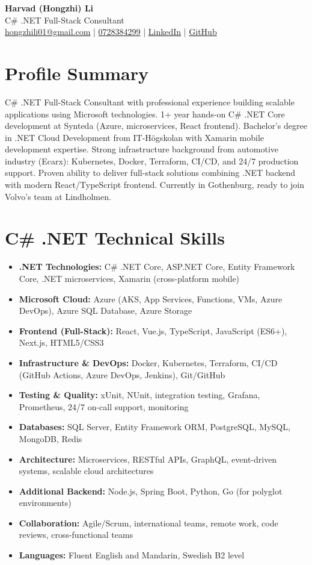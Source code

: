 \documentclass[11pt,a4paper]{article}
\begin{document}
\pagestyle{empty}

\begin{center}
{\LARGE \textbf{Harvad (Hongzhi) Li}}\\[10pt]
{\Large C\# .NET Full-Stack Consultant}\\[10pt]
\textcolor{linkedinblue}{\href{mailto:hongzhili01@gmail.com}{hongzhili01@gmail.com} | \href{tel:0728384299}{0728384299} | \href{https://www.linkedin.com/in/harvad/}{LinkedIn} | \href{https://github.com/bluehawana}{GitHub}}
\end{center}

\section*{Profile Summary}

C\# .NET Full-Stack Consultant with professional experience building scalable applications using Microsoft technologies. 1+ year hands-on C\# .NET Core development at Synteda (Azure, microservices, React frontend). Bachelor's degree in .NET Cloud Development from IT-Högskolan with Xamarin mobile development expertise. Strong infrastructure background from automotive industry (Ecarx): Kubernetes, Docker, Terraform, CI/CD, and 24/7 production support. Proven ability to deliver full-stack solutions combining .NET backend with modern React/TypeScript frontend. Currently in Gothenburg, ready to join Volvo's team at Lindholmen.

\section*{C\# .NET Technical Skills}
\begin{itemize}[leftmargin=*, itemsep=2pt]
\item \textbf{.NET Technologies:} C\# .NET Core, ASP.NET Core, Entity Framework Core, .NET microservices, Xamarin (cross-platform mobile)
\item \textbf{Microsoft Cloud:} Azure (AKS, App Services, Functions, VMs, Azure DevOps), Azure SQL Database, Azure Storage
\item \textbf{Frontend (Full-Stack):} React, Vue.js, TypeScript, JavaScript (ES6+), Next.js, HTML5/CSS3
\item \textbf{Infrastructure \& DevOps:} Docker, Kubernetes, Terraform, CI/CD (GitHub Actions, Azure DevOps, Jenkins), Git/GitHub
\item \textbf{Testing \& Quality:} xUnit, NUnit, integration testing, Grafana, Prometheus, 24/7 on-call support, monitoring
\item \textbf{Databases:} SQL Server, Entity Framework ORM, PostgreSQL, MySQL, MongoDB, Redis
\item \textbf{Architecture:} Microservices, RESTful APIs, GraphQL, event-driven systems, scalable cloud architectures
\item \textbf{Additional Backend:} Node.js, Spring Boot, Python, Go (for polyglot environments)
\item \textbf{Collaboration:} Agile/Scrum, international teams, remote work, code reviews, cross-functional teams
\item \textbf{Languages:} Fluent English and Mandarin, Swedish B2 level
\end{itemize}
\end{document}
